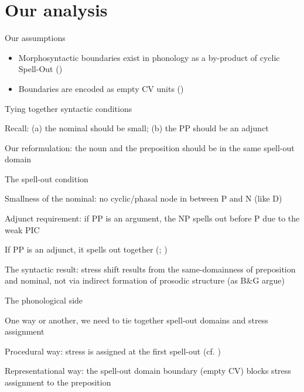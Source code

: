 \documentclass{beamer}
\begin{document}
	\section{Our analysis}

	\begin{frame}{Our assumptions}

		\begin{itemize}
			\item Morphosyntactic boundaries exist in phonology as a by-product of cyclic Spell-Out (\cite{Scheer:2016})

			\item Boundaries are encoded as empty CV units (\cite{Scheer:2012})

		\end{itemize}

	\end{frame}

	\begin{frame}{Tying together syntactic conditions}

		Recall: (a) the nominal should be small; (b) the PP should be an adjunct

		Our reformulation: the noun and the preposition should be in the same spell-out domain

	\end{frame}

	\begin{frame}{The spell-out condition}

		Smallness of the nominal: no cyclic/phasal node in between P and N (like D)

		Adjunct requirement: if PP is an argument, the NP spells out before P due to the weak PIC

		If PP is an adjunct, it spells out together (\cite{Stepanov:2007}; \cite{Privoznov:2021})

		The syntactic result: stress shift results from the same-domainness of preposition and nominal, not via indirect formation of prosodic structure (as B\&G argue)

	\end{frame}

	\begin{frame}{The phonological side}
	
		One way or another, we need to tie together spell-out domains and stress assignment

		Procedural way: stress is assigned at the first spell-out (cf. \cite{Marvin:2013})

		Representational way: the spell-out domain boundary (empty CV) blocks stress assignment to the preposition

	\end{frame}
\end{document}
